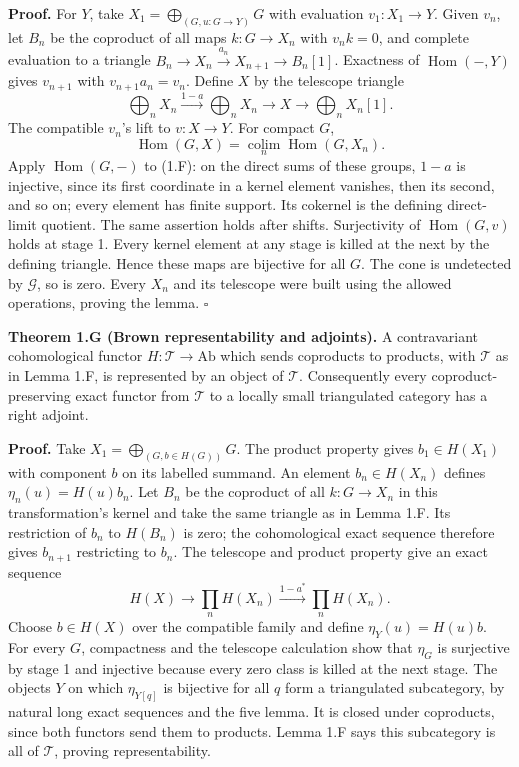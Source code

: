 \documentclass[11pt]{article}
\begin{document}
\textbf{Proof.} For \(Y\), take \(X_1=\bigoplus_{(G,u:G\to Y)}G\) with
evaluation \(v_1:X_1\to Y\). Given \(v_n\), let \(B_n\) be the coproduct
of all maps \(k:G\to X_n\) with \(v_nk=0\), and complete evaluation to a
triangle \(B_n\to X_n\xrightarrow{a_n}X_{n+1}\to B_n[1]\). Exactness of
\(\operatorname{Hom}(-,Y)\) gives \(v_{n+1}\) with \(v_{n+1}a_n=v_n\).
Define \(X\) by the telescope triangle \[
\bigoplus_nX_n\xrightarrow{1-a}\bigoplus_nX_n
\longrightarrow X\longrightarrow\bigoplus_nX_n[1].
\tag{1.F}
\] The compatible \(v_n\)'s lift to \(v:X\to Y\). For compact \(G\), \[
\operatorname{Hom}(G,X)=\underset n{\operatorname{colim}}\operatorname{Hom}(G,X_n).
\] Apply \(\operatorname{Hom}(G,-)\) to (1.F): on the direct sums of
these groups, \(1-a\) is injective, since its first coordinate in a
kernel element vanishes, then its second, and so on; every element has
finite support. Its cokernel is the defining direct-limit quotient. The
same assertion holds after shifts. Surjectivity of
\(\operatorname{Hom}(G,v)\) holds at stage 1. Every kernel element at
any stage is killed at the next by the defining triangle. Hence these
maps are bijective for all \(G\). The cone is undetected by
\(\mathcal G\), so is zero. Every \(X_n\) and its telescope were built
using the allowed operations, proving the lemma. \(\square\)

\textbf{Theorem 1.G (Brown representability and adjoints).} A
contravariant cohomological functor \(H:\mathcal T\to\mathrm{Ab}\) which
sends coproducts to products, with \(\mathcal T\) as in Lemma 1.F, is
represented by an object of \(\mathcal T\). Consequently every
coproduct-preserving exact functor from \(\mathcal T\) to a locally
small triangulated category has a right adjoint.

\textbf{Proof.} Take \(X_1=\bigoplus_{(G,b\in H(G))}G\). The product
property gives \(b_1\in H(X_1)\) with component \(b\) on its labelled
summand. An element \(b_n\in H(X_n)\) defines \(\eta_n(u)=H(u)b_n\). Let
\(B_n\) be the coproduct of all \(k:G\to X_n\) in this transformation's
kernel and take the same triangle as in Lemma 1.F. Its restriction of
\(b_n\) to \(H(B_n)\) is zero; the cohomological exact sequence
therefore gives \(b_{n+1}\) restricting to \(b_n\). The telescope and
product property give an exact sequence \[
H(X)\longrightarrow\prod_nH(X_n)
\xrightarrow{1-a^*}\prod_nH(X_n).
\] Choose \(b\in H(X)\) over the compatible family and define
\(\eta_Y(u)=H(u)b\). For every \(G\), compactness and the telescope
calculation show that \(\eta_G\) is surjective by stage 1 and injective
because every zero class is killed at the next stage. The objects \(Y\)
on which \(\eta_{Y[q]}\) is bijective for all \(q\) form a triangulated
subcategory, by natural long exact sequences and the five lemma. It is
closed under coproducts, since both functors send them to products.
Lemma 1.F says this subcategory is all of \(\mathcal T\), proving
representability.
\end{document}
